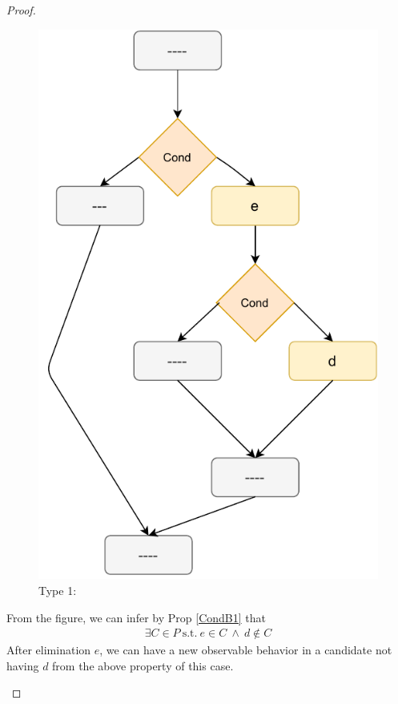 \begin{proof}
\begin{itemize}
\begin{enumerate}
                            \begin{figure}[H]
                                \centering 
                                \includegraphics[scale=0.7]{Elimination/ConditionalsProofFig1.pdf}
                                \caption{Type 1:}    
                            \end{figure}
                        
                            From the figure, we can infer by Prop \ref{CondB1} that  
                            \begin{align*}
                                \exists C \in P \ \text{s.t.} \ e \in C \ \wedge \ d \notin C
                            \end{align*}
                            After elimination $e$, we can have a new observable behavior in a candidate not having $d$ from the above property of this case.  


\end{enumerate}
\end{itemize}
\end{proof}
